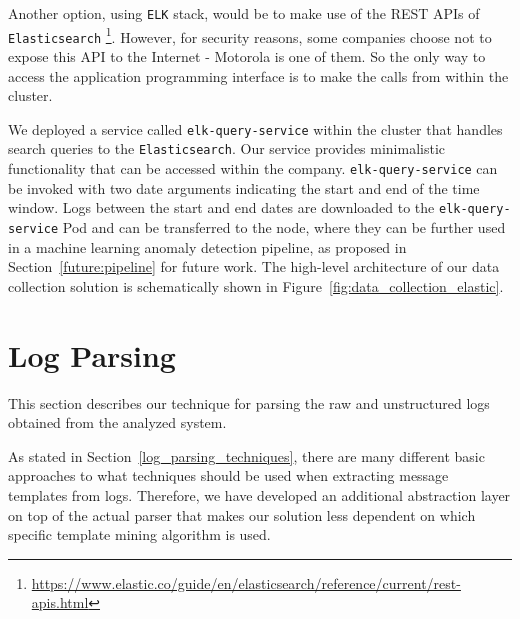 Another option, using \texttt{ELK} stack, would be to make use of the REST APIs of \texttt{Elasticsearch} \footnote{\url{https://www.elastic.co/guide/en/elasticsearch/reference/current/rest-apis.html}}. However, for security reasons, some companies choose not to expose this API to the Internet - Motorola is one of them.
So the only way to access the application programming interface is to make the calls from within the cluster.

We deployed a service called \texttt{elk-query-service} within the cluster that handles search queries to the \texttt{Elasticsearch}. Our service provides minimalistic functionality that can be accessed within the company.
\texttt{\justify elk-query-service} can be invoked with two date arguments indicating the start and end of the time window. Logs between the start and end dates are downloaded to the \texttt{elk-query-service} Pod and can be transferred to the node, where they can be further used in a machine learning anomaly detection pipeline, as proposed in Section~\ref{future:pipeline} for future work. The high-level architecture of our data collection solution is schematically shown in Figure~\ref{fig:data_collection_elastic}.

\begin{figure}[!tbp] 
\end{figure}

\newpage

\section{Log Parsing}
This section describes our technique for parsing the raw and unstructured logs obtained from the analyzed system.

As stated in Section~\ref{log_parsing_techniques}, there are many different basic approaches to what techniques should be used when extracting message templates from logs. 
Therefore, we have developed an additional abstraction layer on top of the actual parser that makes our solution less dependent on which specific template mining algorithm is used.

